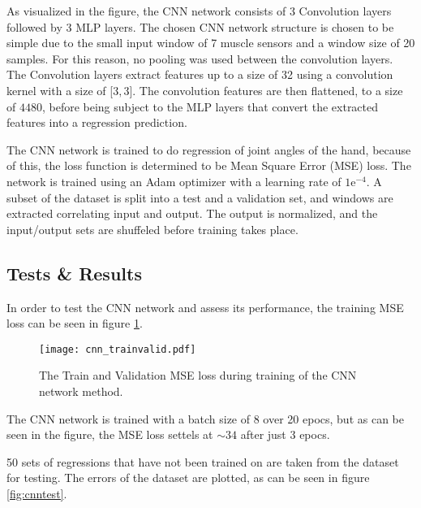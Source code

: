 \documentclass[../main.tex]{subfiles}
\begin{document}
As visualized in the figure, the CNN network consists of 3 Convolution layers followed by 3 MLP layers.
The chosen CNN network structure is chosen to be simple due to the small input window of 7 muscle sensors and a window size of 20 samples.
For this reason, no pooling was used between the convolution layers.
The Convolution layers extract features up to a size of 32 using a convolution kernel with a size of [$3, 3$].
The convolution features are then flattened, to a size of $4480$, before being subject to the MLP layers that convert the extracted features into a regression prediction. 

The CNN network is trained to do regression of joint angles of the hand, because of this, the loss function is determined to be Mean Square Error (MSE) loss.
The network is trained using an Adam optimizer with a learning rate of $1\text{e}^{-4}$.
A subset of the dataset is split into a test and a validation set, and windows are extracted correlating input and output.
The output is normalized, and the input/output sets are shuffeled before training takes place.

\subsection{Tests \& Results}

In order to test the CNN network and assess its performance, the training MSE loss can be seen in figure \ref{fig:cnntrainvalid}.

\begin{figure}[H]
\begin{center}
\texttt{[image: cnn\_trainvalid.pdf]}
\caption{The Train and Validation MSE loss during training of the CNN network method.}
\label{fig:cnntrainvalid}
\end{center}
\end{figure}

The CNN network is trained with a batch size of 8 over 20 epocs, but as can be seen in the figure, the MSE loss settels at $\sim 34$ after just 3 epocs.

50 sets of regressions that have not been trained on are taken from the dataset for testing.
The errors of the dataset are plotted, as can be seen in figure \ref{fig:cnntest}.
\end{document}
